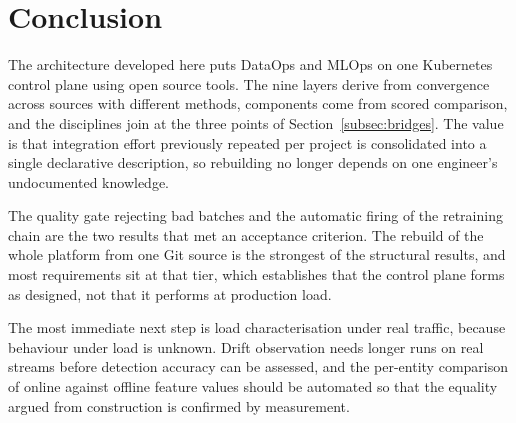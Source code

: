 
\section{Conclusion}
\label{sec:conclusion}

The architecture developed here puts DataOps and MLOps on one Kubernetes control plane using open source tools. The nine layers derive from convergence across sources with different methods, components come from scored comparison, and the disciplines join at the three points of Section~\ref{subsec:bridges}. The value is that integration effort previously repeated per project is consolidated into a single declarative description, so rebuilding no longer depends on one engineer's undocumented knowledge.

The quality gate rejecting bad batches and the automatic firing of the retraining chain are the two results that met an acceptance criterion. The rebuild of the whole platform from one Git source is the strongest of the structural results, and most requirements sit at that tier, which establishes that the control plane forms as designed, not that it performs at production load.

The most immediate next step is load characterisation under real traffic, because behaviour under load is unknown. Drift observation needs longer runs on real streams before detection accuracy can be assessed, and the per-entity comparison of online against offline feature values should be automated so that the equality argued from construction is confirmed by measurement.
